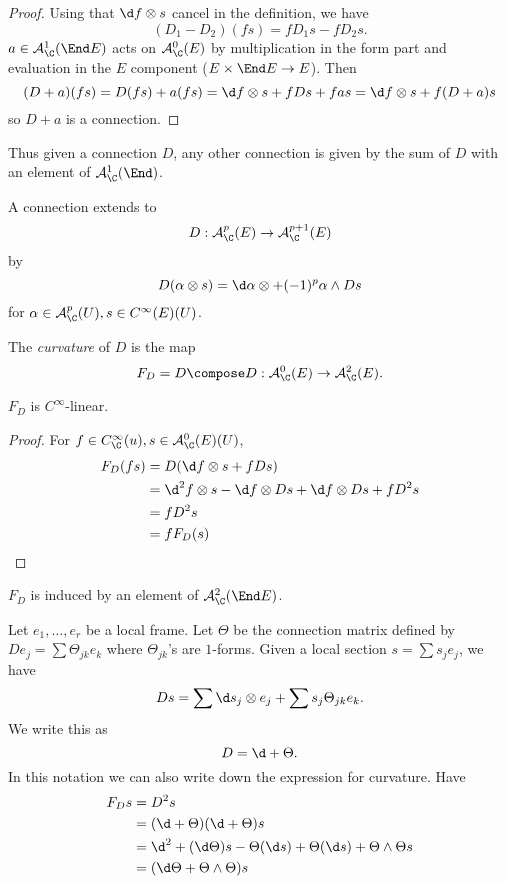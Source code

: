 \documentclass[a4paper]{article}
\newcommand{\w}{\wedge} %
\begin{document}
\begin{proof}
  Using that \(\d f \otimes s\) cancel in the definition, we have
  \[
    (D_1 - D_2)(fs) = f D_1 s - f D_2 s.
  \]
  \(a \in \mathcal A_\C^1(\End E)\) acts on \(\mathcal A^0_\C(E)\) by multiplication in the form part and evaluation in the \(E\) component (\(E \times \End E \to E\)). Then
  \[
    (D + a)(fs)
    = D(fs) + a(fs)
    = \d f \otimes s + f Ds + fas
    = \d f \otimes s + f(D + a) s
  \]
  so \(D + a\) is a connection.
\end{proof}
Thus given a connection \(D\), any other connection is given by the sum of \(D\) with an element of \(\mathcal A_\C^1(\End)\).

A connection extends to
\[
  D: \mathcal A^p_\C(E) \to \mathcal A^{p + 1}_\C(E)
\]
by
\[
  D(\alpha \otimes s) = \d \alpha \otimes + (-1)^p \alpha \w Ds
\]
for \(\alpha \in \mathcal A_\C^p(U), s \in C^\infty(E)(U)\).

\begin{definition}[curvature]
  The \emph{curvature} of \(D\) is the map
  \[
    F_D = D \compose D: \mathcal A^0_\C(E) \to \mathcal A^2_\C(E).
  \]
\end{definition}

\begin{lemma}
  \(F_D\) is \(C^\infty\)-linear.
\end{lemma}

\begin{proof}
  For \(f \in C^\infty_\C(u), s \in \mathcal A_\C^0(E)(U)\),
  \begin{align*}
    F_D(fs)
    &= D(\d f \otimes s + f Ds) \\
    &= \d^2 f \otimes s - \d f \otimes Ds + \d f \otimes Ds + fD^2s \\
    &= fD^2s \\
    &= fF_D(s)
  \end{align*}
\end{proof}

\begin{corollary}
  \(F_D\) is induced by an element of \(\mathcal A_\C^2(\End E)\).
\end{corollary}

Let \(e_1, \dots, e_r\) be a local frame. Let \(\Theta\) be the connection matrix defined by \(D e_j = \sum \Theta_{jk} e_k\) where \(\Theta_{jk}\)'s are \(1\)-forms. Given a local section \(s = \sum s_j e_j\), we have
\[
  Ds = \sum \d s_j \otimes e_j + \sum s_j \Theta_{jk} e_k.
\]
We write this as
\[
  D = \d + \Theta.
\]
In this notation we can also write down the expression for curvature. Have
\begin{align*}
  F_D s
  &= D^2s \\
  &= (\d + \Theta)(\d + \Theta)s \\
  &= \d^2 + (\d \Theta)s - \Theta(\d s) + \Theta(\d s) + \Theta \w \Theta s \\
  &= (\d \Theta + \Theta \w \Theta) s
\end{align*}
\end{document}
